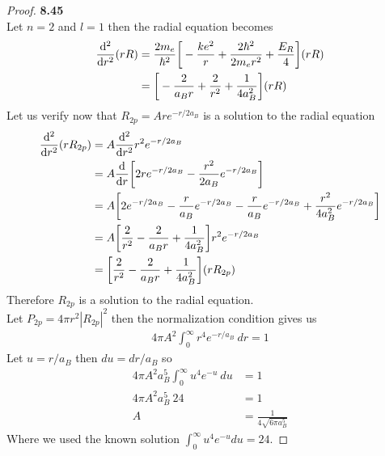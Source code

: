 \documentclass[11pt]{article}
\theoremstyle{definition}
\begin{document}
\cleardoublepage
\begin{proof}{\textbf{8.45}}\\
Let $n = 2$ and $l = 1$ then the radial equation becomes
\begin{align*}
    \dv[2]{r}(rR) &= \frac{2m_e}{\hbar^2}\bigg[-\frac{ke^2}{r}
    + \frac{2\hbar^2}{2m_e r^2} + \frac{E_R}{4}\bigg](rR)\\
    &= \bigg[-\frac{2}{a_B r}
    + \frac{2}{r^2} + \frac{1}{4a_B^2}\bigg](rR)
\end{align*}
Let us verify now that $R_{2p} = Are^{-r/2a_B}$ is a solution to the radial
equation
\begin{align*}
    \dv[2]{r}(rR_{2p}) &= A\dv[2]{r}r^2e^{-r/2a_B}\\
    &= A\dv{r}\bigg[2re^{-r/2a_B} - \frac{r^2}{2a_B}e^{-r/2a_B}\bigg]\\
    &= A\bigg[2e^{-r/2a_B} - \frac{r}{a_B}e^{-r/2a_B}
    - \frac{r}{a_B}e^{-r/2a_B} + \frac{r^2}{4a_B^2}e^{-r/2a_B}\bigg]\\
    &= A\bigg[\frac{2}{r^2} - \frac{2}{a_Br} + \frac{1}{4a_B^2}\bigg]r^2e^{-r/2a_B}\\
    &= \bigg[\frac{2}{r^2} - \frac{2}{a_Br} + \frac{1}{4a_B^2}\bigg](rR_{2p})
\end{align*}
Therefore $R_{2p}$ is a solution to the radial equation.
\\
Let $P_{2p} = 4\pi r^2|R_{2p}|^2$ then the normalization condition gives us
\begin{align*}
    4\pi A^2\int_0^\infty r^4e^{-r/a_B}~dr = 1
\end{align*}
Let $u = r/a_B$ then $du = dr/a_B$ so
\begin{align*}
    4\pi A^2a_B^5\int_0^\infty u^4e^{-u}~du &= 1\\
    4\pi A^2a_B^5~24 &= 1\\
    A &= \frac{1}{4\sqrt{6 \pi a_B^5}}
\end{align*}
Where we used the known solution $\int_0^\infty u^4e^{-u}du = 24$.
\end{proof}
\end{document}
